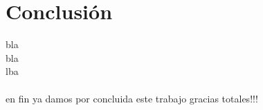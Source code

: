 \section{Conclusión}
bla\\
bla\\
lba\\\\
en fin ya damos por concluida este trabajo gracias totales!!!
